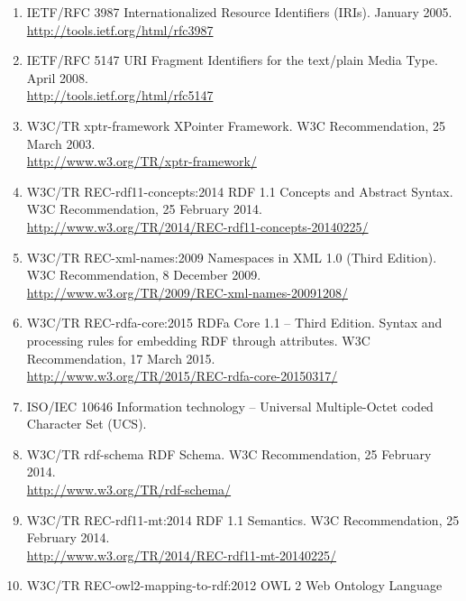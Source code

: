 \documentclass[10pt, a4paper]{isov2}
\begin{document}
\begin{enumerate}[label=\bfseries NR\arabic*, noitemsep]
  \item{IETF/RFC 3987} {Internationalized Resource Identifiers (IRIs). January 2005.\\ \url{http://tools.ietf.org/html/rfc3987}}\label{nref-IRI}
  \item{IETF/RFC 5147} {URI Fragment Identifiers for the text/plain Media Type.  April 2008.\\ \url{http://tools.ietf.org/html/rfc5147}}\label{nref-text/plain-URI}
  \item{W3C/TR xptr-framework} {XPointer Framework.  W3C Recommendation, 25 March 2003. \\ \url{http://www.w3.org/TR/xptr-framework/}}\label{nref-XPointer}
  \item{W3C/TR REC-rdf11-concepts:2014} {RDF 1.1 Concepts and Abstract Syntax.  W3C Recommendation, 25 February 2014. \\ \url{http://www.w3.org/TR/2014/REC-rdf11-concepts-20140225/}}\label{nref-RDF}
  \item{W3C/TR REC-xml-names:2009} {Namespaces in XML 1.0 (Third Edition). W3C Recommendation, 8 December 2009.\\
   \url{http://www.w3.org/TR/2009/REC-xml-names-20091208/}}\label{nref-XMLns}
  \item{W3C/TR REC-rdfa-core:2015} {RDFa Core 1.1 -- Third Edition.  Syntax and processing rules for embedding RDF through attributes. W3C Recommendation, 17 March 2015.\\ \url{http://www.w3.org/TR/2015/REC-rdfa-core-20150317/}}\label{nref-RDFa}
  \item{ISO/IEC 10646} {Information technology – Universal Multiple-Octet coded Character Set (UCS).}\label{nref-UCS}
  \item{W3C/TR rdf-schema} {RDF Schema. W3C Recommendation, 25 February 2014.\\ \url{http://www.w3.org/TR/rdf-schema/}}\label{nref-RDFS}
  \item{W3C/TR REC-rdf11-mt:2014} {RDF 1.1 Semantics.  W3C Recommendation, 25 February 2014. \\ \url{http://www.w3.org/TR/2014/REC-rdf11-mt-20140225/}}\label{nref-RDFSs}
  \item{W3C/TR REC-owl2-mapping-to-rdf:2012} {OWL 2 Web Ontology Language
}
\end{enumerate}
\end{document}
